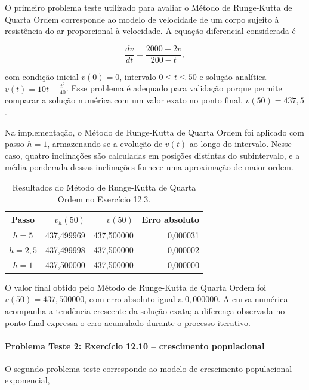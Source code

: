 O primeiro problema teste utilizado para avaliar o Método de Runge-Kutta de Quarta Ordem corresponde ao modelo de velocidade de um corpo sujeito à resistência do ar proporcional à velocidade. A equação diferencial considerada é

\[
    \frac{dv}{dt}=\frac{2000-2v}{200-t},
\]

com condição inicial \(v(0)=0\), intervalo \(0\leq t\leq 50\) e solução analítica \(v(t)=10t-\frac{t^2}{40}\). Esse problema é adequado para validação porque permite comparar a solução numérica com um valor exato no ponto final, \(v(50)=437{,}5\).

Na implementação, o Método de Runge-Kutta de Quarta Ordem foi aplicado com passo \(h=1\), armazenando-se a evolução de \(v(t)\) ao longo do intervalo. Nesse caso, quatro inclinações são calculadas em posições distintas do subintervalo, e a média ponderada dessas inclinações fornece uma aproximação de maior ordem.

\begin{table}[H]
    \centering
    \caption{Resultados do Método de Runge-Kutta de Quarta Ordem no Exercício 12.3.}
    \begin{tabular}{c|r|r|r}
        \textbf{Passo} & \textbf{\(v_h(50)\)} & \textbf{\(v(50)\)} & \textbf{Erro absoluto} \\
        \hline
        \(h=5\) & 437{,}499969 & 437{,}500000 & 0{,}000031 \\
        \(h=2{,}5\) & 437{,}499998 & 437{,}500000 & 0{,}000002 \\
        \(h=1\) & 437{,}500000 & 437{,}500000 & 0{,}000000 \\
    \end{tabular}
\end{table}

O valor final obtido pelo Método de Runge-Kutta de Quarta Ordem foi \(v(50)=437{,}500000\), com erro absoluto igual a \(0{,}000000\). A curva numérica acompanha a tendência crescente da solução exata; a diferença observada no ponto final expressa o erro acumulado durante o processo iterativo.

\paragraph{Problema Teste 2: Exercício 12.10 -- crescimento populacional}

O segundo problema teste corresponde ao modelo de crescimento populacional exponencial,

